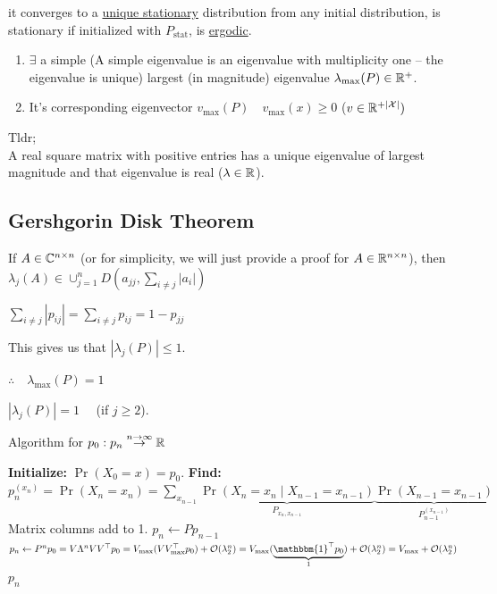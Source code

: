 it converges to a \underline{unique stationary} distribution from any initial distribution, is stationary if initialized with $P_{\text{stat}}$, is \underline{ergodic}.


\begin{enumerate}
    \item $\exists$ a simple (A simple eigenvalue is an eigenvalue with multiplicity one -- the eigenvalue is unique) largest (in magnitude) eigenvalue $\lambda_{\max}(P)\in\mathbb{R}^+$.
    \item It's corresponding eigenvector $v_{\max}(P)\quad v_{\max}(x) \geq 0$ ($v \in \mathbb{R}^{+|\mathcal{X}|})$
\end{enumerate}


Tldr;\\
A real square matrix with positive entries has a unique eigenvalue of largest magnitude and that eigenvalue is real ($\lambda\in\mathbb{R}$).

\subsection{Gershgorin Disk Theorem}
If $A\in \mathbb{C}^{n\times n}$ (or for simplicity, we will just provide a proof for $A\in \mathbb{R}^{n\times n}$), then $\lambda_j(A)\in \cup_{j=1}^n D(a_{jj}, \sum_{i\neq j} |a_i|)$

$
\sum_{i\neq j} |p_{ij}| = \sum_{i\neq j} p_{ij} = 1 - p_{jj}
$

This gives us that $|\lambda_j(P)|\leq1$.

$\therefore\quad \lambda_{\max}(P)=1$

$|\lambda_j(P)|=1\quad$ (if $j\geq2$).

\hrulefill

\begin{algorithm}
\caption{Algorithm for $p_0: p_n\stackrel{n\to\infty}\to \mathbb{R}$}
\begin{algorithmic}
\State \textbf{Initialize: } $\Pr(X_0=x)=p_0$.
\State \textbf{Find: } $p_n^{(x_n)}=\Pr(X_n=x_n)=\displaystyle\sum_{x_{n-1}}
\underbrace{\Pr(X_n=x_n\mid X_{n-1}=x_{n-1})}_{P_{x_n, x_{n-1}}} \underbrace{\Pr(X_{n-1}=x_{n-1})}_{P_{n-1}^{(x_{n-1})}}$
\Ensure Matrix columns add to 1.
\State $p_n \gets Pp_{n-1}$
\State $p_n \gets P^n p_{0} = V\Lambda^{n} VV^\top p_0=V_{\max}(VV_{\max}^\top p_0)+\cO(\lambda_2^n)
= V_{\max}(\underbrace{\mathbbm{1}^\top p_0}_1)+\cO(\lambda_2^n)
= V_{\max}+\cO(\lambda_2^n)
$
\EndWhile
\State \Return $p_n$
\end{algorithmic}
\end{algorithm}

